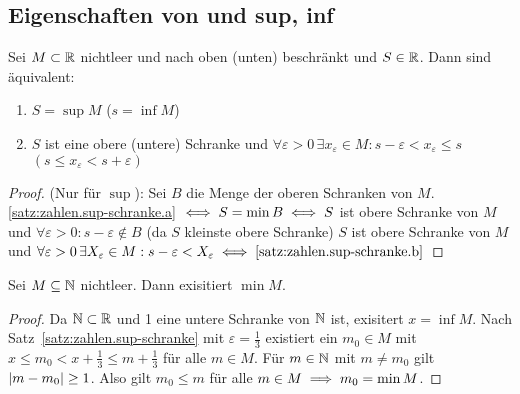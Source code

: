 \documentclass[12pt]{scrreprt}
\begin{document}
\subsection*{Eigenschaften von  und sup, inf}
\begin{satz}\label{satz:zahlen.sup-schranke}
Sei $M \subset \mathbb{R}$ nichtleer und nach oben (unten) beschränkt
und $S \in \mathbb{R}$. Dann sind äquivalent:
\begin{enumerate}
\item \label{satz:zahlen.sup-schranke.a} 
$S = \sup M$ ($s = \inf M$)
\item \label{satz:zahlen.sup-schranke.b}
$S$ ist eine obere (untere) Schranke und $\forall \varepsilon > 0\, \exists x_\varepsilon \in M: s - \varepsilon < x_\varepsilon \le s $ $( s \le x_\varepsilon < s+\varepsilon)$
\end{enumerate}
\end{satz}
\begin{proof}
(Nur für $\sup$):
Sei $B$ die Menge der oberen Schranken von $M$.
\ref{satz:zahlen.sup-schranke.a} $\iff S= \min B \iff S$ ist obere Schranke von $M$ und $\forall \varepsilon > 0 : s - \varepsilon \notin B$
(da $S$ kleinste obere Schranke) \gdw $S$ ist obere Schranke von $M$ und 
$\forall \varepsilon > 0\,\exists X_\varepsilon \in M: s-\varepsilon < X_\varepsilon \iff \ref{satz:zahlen.sup-schranke.b}$
\end{proof}

\begin{satz}\label{satz:zahlen.min-in-nat}
Sei $M \subseteq \mathbb{N}$ nichtleer. Dann exisitiert $\min M$.
\end{satz}
\begin{proof}
Da $\mathbb{N} \subset \mathbb{R}$ und 1 eine untere Schranke von $\mathbb{N}$ ist,
exisitert $x = \inf M$. Nach Satz~\ref{satz:zahlen.sup-schranke} mit $\varepsilon = \frac{1}{3}$ existiert
ein $m_0 \in M$ mit $ x \le m_0 < x + \frac{1}{3} \le m + \frac{1}{3}$ für alle $ m \in M$.
Für $m \in \mathbb{N}$ mit $m \ne m_0$ gilt $\left\lvert m - m_0\right\lvert \ge 1$. Also gilt $m_0 \le m$ für alle $ m\in M \implies m_0 = \min M$.
\end{proof}
\end{document}
